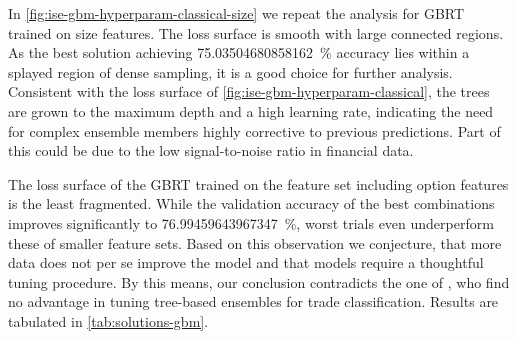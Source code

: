 In \cref{fig:ise-gbm-hyperparam-classical-size} we repeat the analysis for \gls{GBRT} trained on size features. The loss surface is smooth with large connected regions. As the best solution achieving \SI{75.03504680858162}{\percent} accuracy lies within a splayed region of dense sampling, it is a good choice for further analysis. Consistent with the loss surface of \cref{fig:ise-gbm-hyperparam-classical}, the trees are grown to the maximum depth and a high learning rate, indicating the need for complex ensemble members highly corrective to previous predictions. Part of this could be due to the low signal-to-noise ratio in financial data.

The loss surface of the \gls{GBRT} trained on the feature set including option features is the least fragmented. While the validation accuracy of the best combinations improves significantly to \SI{76.99459643967347}{\percent}, worst trials even underperform these of smaller feature sets. Based on this observation we conjecture, that more data does not per se improve the model and that models require a thoughtful tuning procedure. By this means, our conclusion contradicts the one of \textcite[][14]{ronenMachineLearningTrade2022}, who find no advantage in tuning tree-based ensembles for trade classification. Results are tabulated in \cref{tab:solutions-gbm}.

